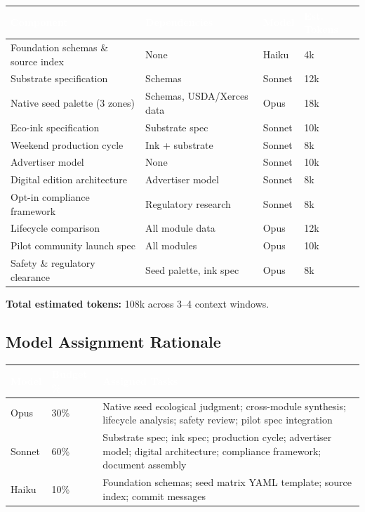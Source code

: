 \documentclass[11pt,letterpaper]{article}
\newcommand{\tableheader}[1]{\textbf{\sffamily\textcolor{white}{#1}}}
\begin{document}
\begin{center}
\begin{tabularx}{\textwidth}{L{3.5cm}L{2.5cm}C{2cm}C{2.5cm}}
\toprule
{}
\tableheader{Component} & \tableheader{Dependencies} & \tableheader{Model} & \tableheader{Est. Tokens} \\
\midrule
Foundation schemas \& source index & None & Haiku & 4k \\
Substrate specification & Schemas & Sonnet & 12k \\
Native seed palette (3 zones) & Schemas, USDA/Xerces data & Opus & 18k \\
Eco-ink specification & Substrate spec & Sonnet & 10k \\
Weekend production cycle & Ink + substrate & Sonnet & 8k \\
Advertiser model & None & Sonnet & 10k \\
Digital edition architecture & Advertiser model & Sonnet & 8k \\
Opt-in compliance framework & Regulatory research & Sonnet & 8k \\
Lifecycle comparison & All module data & Opus & 12k \\
Pilot community launch spec & All modules & Opus & 10k \\
Safety \& regulatory clearance & Seed palette, ink spec & Opus & 8k \\
\bottomrule
\end{tabularx}
\end{center}

\textbf{Total estimated tokens:} 108k across 3--4 context windows.

\subsection{Model Assignment Rationale}

\begin{center}
\begin{tabularx}{\textwidth}{L{2cm}C{2cm}X}
\toprule
{}
\tableheader{Model} & \tableheader{Budget \%} & \tableheader{Assigned Tasks} \\
\midrule
Opus & 30\% & Native seed ecological judgment; cross-module synthesis; lifecycle analysis; safety review; pilot spec integration \\
Sonnet & 60\% & Substrate spec; ink spec; production cycle; advertiser model; digital architecture; compliance framework; document assembly \\
Haiku & 10\% & Foundation schemas; seed matrix YAML template; source index; commit messages \\
\bottomrule
\end{tabularx}
\end{center}
\end{document}
